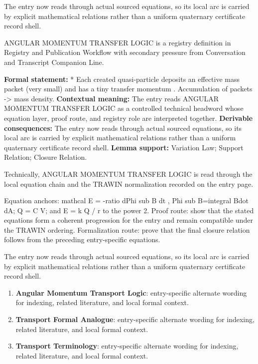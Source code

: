 The entry now reads through actual sourced equations, so its local arc is carried by explicit mathematical relations rather than a uniform quaternary certificate record shell.
\clearpage


\begingroup\small
{}
ANGULAR MOMENTUM TRANSFER LOGIC is a registry definition in Registry and Publication Workflow with secondary pressure from Conversation and Transcript Companion Line.

\begingroup\footnotesize\setlength{\emergencystretch}{3em}\sloppy
\textbf{Formal statement:} * Each created quasi-particle deposits an effective mass packet (very small) and has a tiny transfer momentum . Accumulation of packets -> mass density. \textbf{Contextual meaning:} The entry reads ANGULAR MOMENTUM TRANSFER LOGIC as a controlled technical headword whose equation layer, proof route, and registry role are interpreted together. \textbf{Derivable consequences:} The entry now reads through actual sourced equations, so its local arc is carried by explicit mathematical relations rather than a uniform quaternary certificate record shell. \textbf{Lemma support:} Variation Law; Support Relation; Closure Relation.\par
\endgroup

Technically, ANGULAR MOMENTUM TRANSFER LOGIC is read through the local equation chain and the TRAWIN normalization recorded on the entry page.

Equation anchors: mathcal E = -ratio dPhi sub B dt , Phi sub B=integral Bdot dA; Q = C V; and E = k Q / r to the power 2. Proof route: show that the stated equations form a coherent progression for the entry and remain compatible under the TRAWIN ordering. Formalization route: prove that the final closure relation follows from the preceding entry-specific equations.

The entry now reads through actual sourced equations, so its local arc is carried by explicit mathematical relations rather than a uniform quaternary certificate record shell.
\endgroup

\begin{enumerate}[leftmargin=1.6em,itemsep=6pt,topsep=4pt]
\item \textbf{Angular Momentum Transport Logic}: entry-specific alternate wording for indexing, related literature, and local formal context.
\item \textbf{Transport Formal Analogue}: entry-specific alternate wording for indexing, related literature, and local formal context.
\item \textbf{Transport Terminology}: entry-specific alternate wording for indexing, related literature, and local formal context.
\end{enumerate}

